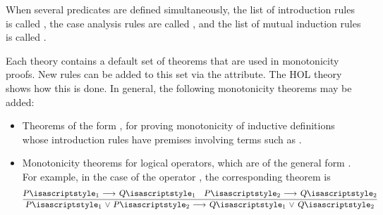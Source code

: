 \begin{isabellebody}
\begin{isamarkuptext}
  When several predicates  are
  defined simultaneously, the list of introduction rules is called
  , the case analysis rules are
  called , and the list
  of mutual induction rules is called .%
\end{isamarkuptext}%
\isamarkuptrue%
%
\isamarkuptrue%
%
\begin{isamarkuptext}%
Each theory contains a default set of theorems that are used in
  monotonicity proofs.  New rules can be added to this set via the
  \hyperlink{attribute.HOL.mono}{\mbox{}} attribute.  The HOL theory 
  shows how this is done.  In general, the following monotonicity
  theorems may be added:

  \begin{itemize}

  \item Theorems of the form , for proving
  monotonicity of inductive definitions whose introduction rules have
  premises involving terms such as .

  \item Monotonicity theorems for logical operators, which are of the
  general form \isa{{\isachardoublequote}{\isacharparenleft}{\isasymdots}\ {\isasymlongrightarrow}\ {\isasymdots}{\isacharparenright}\ {\isasymLongrightarrow}\ {\isasymdots}\ {\isacharparenleft}{\isasymdots}\ {\isasymlongrightarrow}\ {\isasymdots}{\isacharparenright}\ {\isasymLongrightarrow}\ {\isasymdots}\ {\isasymlongrightarrow}\ {\isasymdots}{\isachardoublequote}}.  For example, in
  the case of the operator \isa{{\isachardoublequote}{\isasymor}{\isachardoublequote}}, the corresponding theorem is
  \[
  \infer{\isa{{\isachardoublequote}P\isactrlsub {\isadigit{1}}\ {\isasymor}\ P\isactrlsub {\isadigit{2}}\ {\isasymlongrightarrow}\ Q\isactrlsub {\isadigit{1}}\ {\isasymor}\ Q\isactrlsub {\isadigit{2}}{\isachardoublequote}}}{\isa{{\isachardoublequote}P\isactrlsub {\isadigit{1}}\ {\isasymlongrightarrow}\ Q\isactrlsub {\isadigit{1}}{\isachardoublequote}} & \isa{{\isachardoublequote}P\isactrlsub {\isadigit{2}}\ {\isasymlongrightarrow}\ Q\isactrlsub {\isadigit{2}}{\isachardoublequote}}}
  \]


\end{itemize}
\end{isamarkuptext}
\end{isabellebody}
